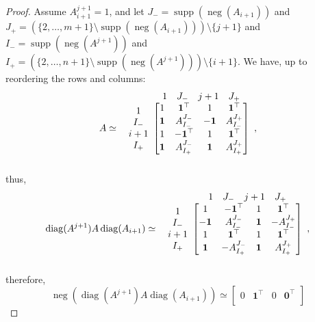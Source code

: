 \documentclass[10pt,a4paper]{amsart}
\DeclareMathOperator{\diag}{diag}
\DeclareMathOperator{\nega}{neg}
\DeclareMathOperator{\supp}{supp}
\begin{document}
\begin{proof}
Assume $A_{i+1}^{j+1}=1$, and let $J_{-} = \supp(\nega(A_{i+1}))$ and $J_{+} = (\{2,\ldots,m+1\}\setminus \supp(\nega(A_{i+1})))\setminus\{j+1\}$ and 
$I_{-} = \supp(\nega(A^{j+1}))$ and $I_{+} = (\{2,\ldots,n+1\}\setminus \supp(\nega(A^{j+1})))\setminus\{i+1\}$.
We have, up to reordering the rows and columns: 
$$A \simeq \begin{array}{c@{}c}
& \begin{array}{cccc}
	1 & J_-& j+1 & J_+
\end{array}\\
\begin{array}{c}
	1\\I_- \\ i+1 \\ I_+
\end{array} &\begin{bmatrix}
	1& \mathbf{1}^\top &1&\mathbf{1}^\top\\ 
	\mathbf{1} & A_{I_-}^{J_-} & \mathbf{-1} &  A_{I_-}^{J_+}\\
	1 & \mathbf{-1}^\top & 1 & \mathbf{1}^\top \\
	\mathbf{1}& A_{I_+}^{J_-} & \mathbf{1} & A_{I_+}^{J_+}
\end{bmatrix}\\&\end{array},$$
thus,
$$\diag(A^{j+1})A\diag(A_{i+1}) \simeq \begin{array}{c@{}c}
& \begin{array}{cccc}
	1 & J_-& j+1 & J_+
\end{array}\\
\begin{array}{c}
	1\\I_- \\ i+1 \\ I_+
\end{array} &\begin{bmatrix}
	1 & \mathbf{-1}^\top & 1 & \mathbf{1}^\top \\
	\mathbf{-1} & A_{I_-}^{J_-} & \mathbf{1} & - A_{I_-}^{J_+}\\
	1& \mathbf{1}^\top &1&\mathbf{1}^\top\\ 
	\mathbf{1}& -A_{I_+}^{J_-} & \mathbf{1} & A_{I_+}^{J_+}
\end{bmatrix}\\&\end{array},$$
therefore,
$$\nega (\diag(A^{j+1})A\diag(A_{i+1})) \simeq\begin{bmatrix}
0 &\mathbf{1}^\top & 0& \mathbf{0}^\top\\

\end{bmatrix}$$
\end{proof}
\end{document}
